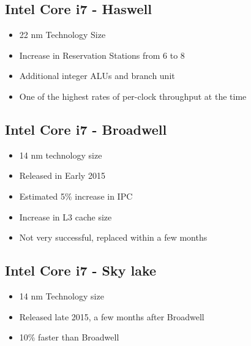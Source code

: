 \subsection{Intel Core i7 - Haswell}

\begin{itemize}
	\item 22 nm Technology Size
	\item Increase in Reservation Stations from 6 to 8
	\item Additional integer ALUs and branch unit
	\item One of the highest rates of per-clock throughput at the time
\end{itemize}


\subsection{Intel Core i7 - Broadwell}

\begin{itemize}
	\item 14 nm technology size
	\item Released in Early 2015
	\item Estimated 5\% increase in IPC
	\item Increase in L3 cache size
	\item Not very successful, replaced within a few months
\end{itemize}

\subsection{Intel Core i7 - Sky lake}

\begin{itemize}
	\item 14 nm Technology size
	\item Released late 2015, a few months after Broadwell
	\item 10\% faster than Broadwell
\end{itemize}
